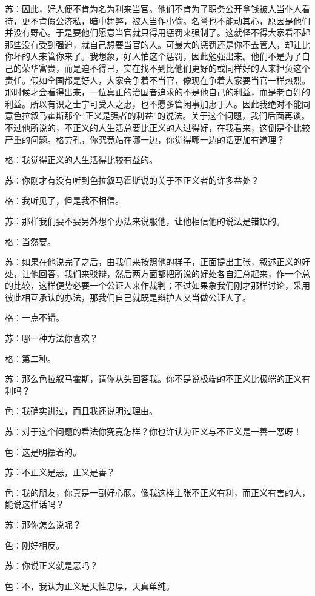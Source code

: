 \documentclass[11pt,oneside]{book}
\begin{document}
\begin{common-format}
苏：因此，好人便不肯为名为利来当官。他们不肯为了职务公开拿钱被人当仆人看待，更不肯假公济私，暗中舞弊，被人当作小偷。名誉也不能动其心，原因是他们并没有野心。于是要他们愿意当官就只得用惩罚来强制了。这就怪不得大家看不起那些没有受到强迫，就自己想要当官的人。可最大的惩罚还是你不去管人，却让比你坏的人来管你来了。我想象，好人怕这个惩罚，因此勉强出来。他们不是为了自己的荣华富贵，而是迫不得已，实在找不到比他们更好的或同样好的人来担负这个责任。假如全国都是好人，大家会争着不当官，像现在争着大家要当官一样热烈。那时候才会看得出来，一位真正的治国者追求的不是他自己的利益，而是老百姓的利益。所以有识之士宁可受人之惠，也不愿多管闲事加惠于人。因此我绝对不能同意色拉叙马霍斯那个“正义是强者的利益”的说法。关于这个问题，我们后面再谈。不过他所说的，不正义的人生活总要比正义的人过得好，在我看来，这倒是个比较严重的问题。格劳孔，你究竟站在哪一边，你觉得哪一边的话更加有道理？

格：我觉得正义的人生活得比较有益的。

苏：你刚才有没有听到色拉叙马霍斯说的关于不正义者的许多益处？

格：我听见了，但是我不相信。

苏：那样我们要不要另外想个办法来说服他，让他相信他的说法是错误的。

格：当然要。

苏：如果在他说完了之后，由我们来按照他的样子，正面提出主张，叙述正义的好处，让他回答，我们来驳辩，然后两方面都把所说的好处各自汇总起来，作一个总的比较，这样便势必要一个公证人来作裁判；不过如果象我们刚才那样讨论，采用彼此相互承认的办法，那我们自己就既是辩护人又当做公证人了。

格：一点不错。

苏：哪一种方法你喜欢？

格：第二种。

苏：那么色拉叙马霍斯，请你从头回答我。你不是说极端的不正义比极端的正义有利吗？

色：我确实讲过，而且我还说明过理由。

苏：对于这个问题的看法你究竟怎样？你也许认为正义与不正义是一善一恶呀！

色：这是明摆着的。

苏：不正义是恶，正义是善？

色：我的朋友，你真是一副好心肠。像我这样主张不正义有利，而正义有害的人，能说这样话吗？

苏：那你怎么说呢？

色：刚好相反。

苏：你说正义就是恶吗？

色：不，我认为正义是天性忠厚，天真单纯。


\end{common-format}
\end{document}
